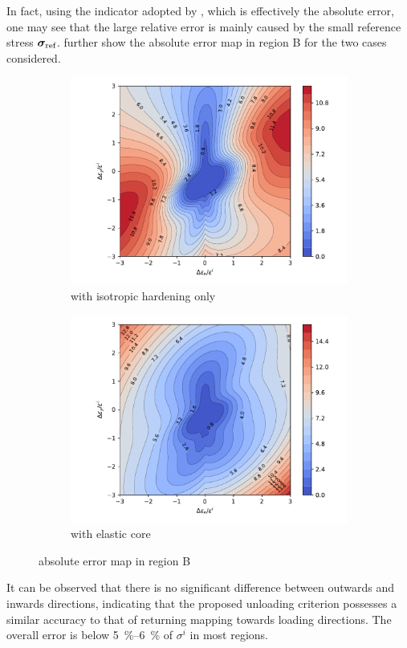 In fact, using the indicator adopted by \citet{Anjiki2019}, which is effectively the absolute error, one may see that the large relative error is mainly caused by the small reference stress $\bm{\sigma}_\text{ref}$.
 further show the absolute error map in region B for the two cases considered.
\begin{figure}[htb]
    \centering
    \begin{subfigure}{.48\textwidth}\centering
        \includegraphics[width=.99\textwidth]{PIC/ISOMAP/abs.error.iso.uniaxial.pdf}
        \caption{with isotropic hardening only}\label{fig:abs_error_euler_with_iso}
    \end{subfigure}\hfill
    \begin{subfigure}{.48\textwidth}\centering
        \includegraphics[width=.99\textwidth]{PIC/ISOMAP/abs.error.core.uniaxial.pdf}
        \caption{with elastic core}\label{fig:abs_error_euler_with_core}
    \end{subfigure}
    \caption{absolute error map in region B}\label{fig:abs_error}
\end{figure}
It can be observed that there is no significant difference between outwards and inwards directions, indicating that the proposed unloading criterion possesses a similar accuracy to that of returning mapping towards loading directions.
The overall error is below \SIrange{5}{6}{\percent} of $\sigma^i$ in most regions.
